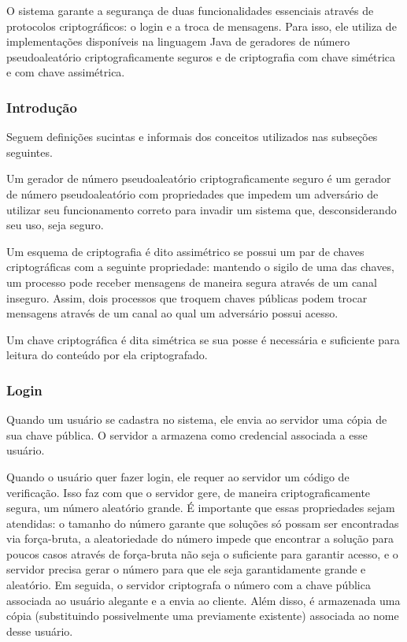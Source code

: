 \documentclass[../main.tex]{subfiles}
\begin{document}
O sistema garante a segurança de duas funcionalidades essenciais através de protocolos criptográficos: o login e a troca de mensagens.
Para isso, ele utiliza de implementações disponíveis na linguagem Java de geradores de número pseudoaleatório criptograficamente seguros e de criptografia com chave simétrica e com chave assimétrica.

\subsubsection{Introdução}

Seguem definições sucintas e informais dos conceitos utilizados nas subseções seguintes.

Um gerador de número pseudoaleatório criptograficamente seguro é um gerador de número pseudoaleatório com propriedades que impedem um adversário de utilizar seu funcionamento correto para invadir um sistema que, desconsiderando seu uso, seja seguro.

Um esquema de criptografia é dito assimétrico se possui um par de chaves criptográficas com a seguinte propriedade: mantendo o sigilo de uma das chaves, um processo pode receber mensagens de maneira segura através de um canal inseguro.
Assim, dois processos que troquem chaves públicas podem trocar mensagens através de um canal ao qual um adversário possui acesso.

Um chave criptográfica é dita simétrica se sua posse é necessária e suficiente para leitura do conteúdo por ela criptografado.

\subsubsection{Login}

Quando um usuário se cadastra no sistema, ele envia ao servidor uma cópia de sua chave pública.
O servidor a armazena como credencial associada a esse usuário.

Quando o usuário quer fazer login, ele requer ao servidor um código de verificação.
Isso faz com que o servidor gere, de maneira criptograficamente segura, um número aleatório grande.
É importante que essas propriedades sejam atendidas: o tamanho do número garante que soluções só possam ser encontradas via força-bruta, a aleatoriedade do número impede que encontrar a solução para poucos casos através de força-bruta não seja o suficiente para garantir acesso, e o servidor precisa gerar o número para que ele seja garantidamente grande e aleatório.
Em seguida, o servidor criptografa o número com a chave pública associada ao usuário alegante e a envia ao cliente.
Além disso, é armazenada uma cópia (substituindo possivelmente uma previamente existente) associada ao nome desse usuário.
\end{document}

